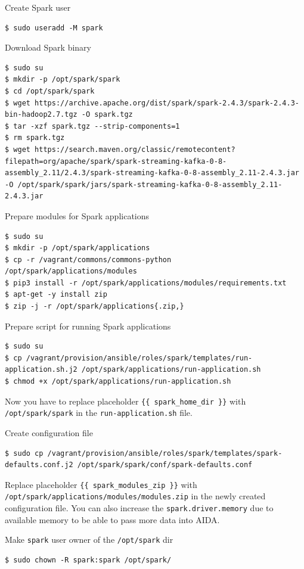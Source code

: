 \documentclass[a4paper]{article} %
\begin{document}
Create Spark user
\begin{lstlisting}
$ sudo useradd -M spark
\end{lstlisting}

Download Spark binary
\begin{lstlisting}
$ sudo su
$ mkdir -p /opt/spark/spark
$ cd /opt/spark/spark
$ wget https://archive.apache.org/dist/spark/spark-2.4.3/spark-2.4.3-bin-hadoop2.7.tgz -O spark.tgz
$ tar -xzf spark.tgz --strip-components=1
$ rm spark.tgz
$ wget https://search.maven.org/classic/remotecontent?filepath=org/apache/spark/spark-streaming-kafka-0-8-assembly_2.11/2.4.3/spark-streaming-kafka-0-8-assembly_2.11-2.4.3.jar -O /opt/spark/spark/jars/spark-streaming-kafka-0-8-assembly_2.11-2.4.3.jar
\end{lstlisting}

Prepare modules for Spark applications
\begin{lstlisting}
$ sudo su
$ mkdir -p /opt/spark/applications
$ cp -r /vagrant/commons/commons-python /opt/spark/applications/modules
$ pip3 install -r /opt/spark/applications/modules/requirements.txt
$ apt-get -y install zip
$ zip -j -r /opt/spark/applications{.zip,}
\end{lstlisting}

Prepare script for running Spark applications
\begin{lstlisting}
$ sudo su
$ cp /vagrant/provision/ansible/roles/spark/templates/run-application.sh.j2 /opt/spark/applications/run-application.sh
$ chmod +x /opt/spark/applications/run-application.sh
\end{lstlisting}

Now you have to replace placeholder \texttt{\{\{ spark\_home\_dir \}\}} with \texttt{/opt/spark/spark}
in the \texttt{run-application.sh} file.

Create configuration file
\begin{lstlisting}
$ sudo cp /vagrant/provision/ansible/roles/spark/templates/spark-defaults.conf.j2 /opt/spark/spark/conf/spark-defaults.conf
\end{lstlisting}

Replace placeholder \texttt{\{\{ spark\_modules\_zip \}\}} with \texttt{/opt/spark/applications/modules/modules.zip}
in the newly created configuration file. You can also increase the \texttt{spark.driver.memory} due to available
memory to be able to pass more data into AIDA.

Make \texttt{spark} user owner of the \texttt{/opt/spark} dir
\begin{lstlisting}
$ sudo chown -R spark:spark /opt/spark/
\end{lstlisting}
\end{document}
